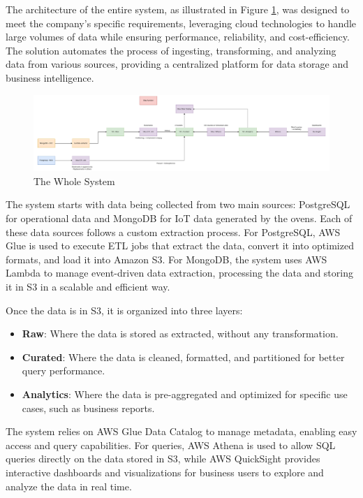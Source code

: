 The architecture of the entire system, as illustrated in Figure \ref{fig:wholesystem}, was designed to meet the company’s specific requirements, leveraging cloud technologies to handle large volumes of data while ensuring performance, reliability, and cost-efficiency. The solution automates the process of ingesting, transforming, and analyzing data from various sources, providing a centralized platform for data storage and business intelligence.

\begin{figure}[H]
    \centering
    \includegraphics[width=1\textwidth]{res/unox-datalake-v2.pdf}
    \caption{The Whole System}
    \label{fig:wholesystem}
\end{figure}

The system starts with data being collected from two main sources: PostgreSQL for operational data and MongoDB for IoT data generated by the ovens. Each of these data sources follows a custom extraction process. For PostgreSQL, \ac{AWS} Glue is used to execute \ac{ETL} jobs that extract the data, convert it into optimized formats, and load it into Amazon \ac{S3}. For MongoDB, the system uses \ac{AWS} Lambda to manage event-driven data extraction, processing the data and storing it in \ac{S3} in a scalable and efficient way.

Once the data is in \ac{S3}, it is organized into three layers:
\begin{itemize}
    \item \textbf{Raw}: Where the data is stored as extracted, without any transformation.
    \item \textbf{Curated}: Where the data is cleaned, formatted, and partitioned for better query performance.
    \item \textbf{Analytics}: Where the data is pre-aggregated and optimized for specific use cases, such as business reports.
\end{itemize}
The system relies on \ac{AWS} Glue Data Catalog to manage metadata, enabling easy access and query capabilities. For queries, \ac{AWS} Athena is used to allow \ac{SQL} queries directly on the data stored in \ac{S3}, while \ac{AWS} QuickSight provides interactive dashboards and visualizations for business users to explore and analyze the data in real time.

